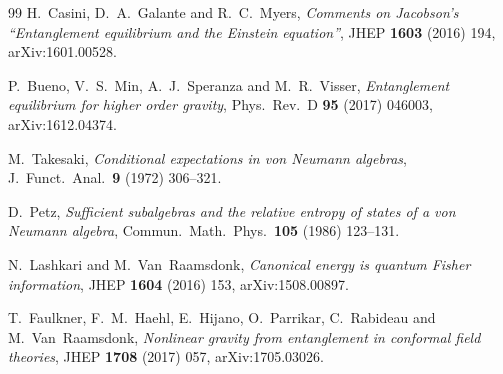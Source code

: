 \documentclass[12pt]{article}
\theoremstyle{definition}
\theoremstyle{remark}
\begin{document}
\begin{thebibliography}{99}
H.~Casini, D.~A.~Galante and R.~C.~Myers, \emph{Comments on Jacobson's ``Entanglement
equilibrium and the Einstein equation''}, JHEP \textbf{1603} (2016) 194, arXiv:1601.00528.

P.~Bueno, V.~S.~Min, A.~J.~Speranza and M.~R.~Visser, \emph{Entanglement equilibrium for
higher order gravity}, Phys.\ Rev.\ D \textbf{95} (2017) 046003, arXiv:1612.04374.

M.~Takesaki, \emph{Conditional expectations in von Neumann algebras}, J.\ Funct.\ Anal.\
\textbf{9} (1972) 306--321.

D.~Petz, \emph{Sufficient subalgebras and the relative entropy of states of a von Neumann
algebra}, Commun.\ Math.\ Phys.\ \textbf{105} (1986) 123--131.

N.~Lashkari and M.~Van~Raamsdonk, \emph{Canonical energy is quantum Fisher information},
JHEP \textbf{1604} (2016) 153, arXiv:1508.00897.

T.~Faulkner, F.~M.~Haehl, E.~Hijano, O.~Parrikar, C.~Rabideau and M.~Van~Raamsdonk,
\emph{Nonlinear gravity from entanglement in conformal field theories}, JHEP \textbf{1708}
(2017) 057, arXiv:1705.03026.

\end{thebibliography}
\end{document}
